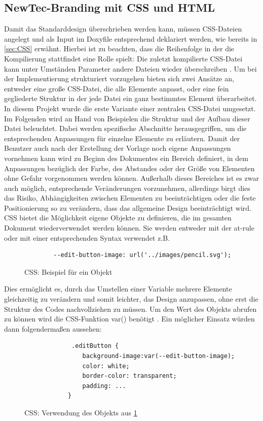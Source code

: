 \documentclass[11pt,a4paper]{report}
\begin{document}
\subsection{NewTec-Branding mit CSS und HTML}

Damit das Standarddesign überschrieben werden kann, müssen CSS-Dateien angelegt und als Input im Doxyfile entsprechend deklariert werden, wie bereits in \ref{sec:CSS} erwähnt. Hierbei ist zu beachten, dass die Reihenfolge in der die Kompilierung stattfindet eine Rolle spielt: Die zuletzt kompilierte CSS-Datei kann unter Umständen Parameter andere Dateien wieder überschreiben \cite{CSS_Tutorial}. Um bei der Implementierung strukturiert vorzugehen bieten sich zwei Ansätze an, entweder eine große CSS-Datei, die alle Elemente anpasst, oder eine fein gegliederte Struktur in der jede Datei ein ganz bestimmtes Element überarbeitet. In diesem Projekt wurde die erste Variante einer zentralen CSS-Datei umgesetzt. Im Folgenden wird an Hand von Beispielen die Struktur und der Aufbau dieser Datei beleuchtet. Dabei werden spezifische Abschnitte herausgegriffen, um die entsprechenden Anpassungen für einzelne Elemente zu erläutern.\newpage
Damit der Benutzer auch nach der Erstellung der Vorlage noch eigene Anpassungen vornehmen kann wird zu Beginn des Dokumentes ein Bereich definiert, in dem Anpassungen bezüglich der Farbe, des Abstandes oder der Größe von Elementen ohne Gefahr vorgenommen werden können. Außerhalb dieses Bereiches ist es zwar auch möglich, entsprechende Veränderungen vorzunehmen, allerdings birgt dies das Risiko, Abhängigkeiten zwischen Elementen zu beeinträchtigen oder die feste Positionierung so zu verändern, dass das allgemeine Design beeinträchtigt wird. CSS bietet die Möglichkeit eigene Objekte zu definieren, die im gesamten Dokument wiederverwendet werden können. Sie werden entweder mit der \glqq at-rule \grqq{} oder mit einer entsprechenden Syntax verwendet \cite{CSS_Properties} z.B.
\begin{figure}[h]
\centering
\begin{verbatim}
        --edit-button-image: url('../images/pencil.svg');  
\end{verbatim} 
\caption{CSS: Beispiel für ein Objekt}
\label{code:CSS_Example}
\end{figure}

\noindent
Dies ermöglicht es, durch das Umstellen einer Variable mehrere Elemente gleichzeitig zu verändern und somit leichter, das Design anzupassen, ohne erst die Struktur des Codes nachvollziehen zu müssen. Um den Wert des Objekts abrufen zu können wird die CSS-Funktion var() benötigt \cite{CSS_var_funktion}. Ein möglicher Einsatz würden dann folgendermaßen aussehen:
\begin{figure}[h]
    \centering
    \begin{verbatim}
             .editButton {
                background-image:var(--edit-button-image);
                color: white;
                border-color: transparent;
                padding: ...
            }     
    \end{verbatim}
    \caption{CSS: Verwendung des Objekts aus \ref{code:CSS_Example}}
    \label{code:CSS_Example_Advanced}
\end{figure}
\end{document}
